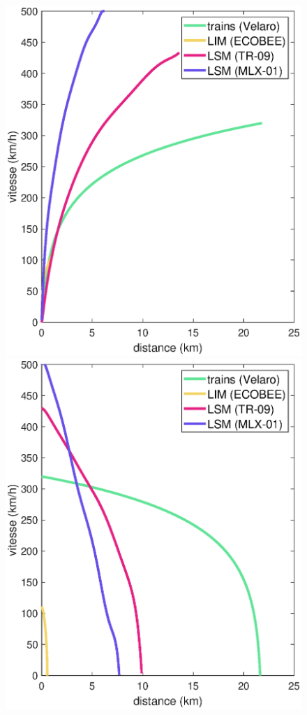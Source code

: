 \documentclass[12pt, a4paper, onecolumn]{article}
\begin{document}
\begin{appendix}
\begin{figure}[H]
    \begin{minipage}[H]{0.49\textwidth}
      \includegraphics[width=\textwidth]{./fig/Adv.eps}
    \end{minipage}
    \hfill
    \begin{minipage}[H]{0.49\textwidth}
      \includegraphics[width=\textwidth]{./fig/Ddv.eps}

\end{minipage}
\end{figure}
\end{appendix}
\end{document}
